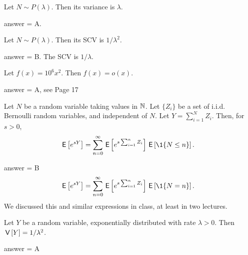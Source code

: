 \begin{exercise}[201902]
Let $N\sim P(\lambda)$. Then its variance is  $\lambda$. 

\begin{solution}
answer = A. %
\end{solution}
\end{exercise}

\begin{exercise}[201902]
Let $N\sim P(\lambda)$. Then its SCV is  $1/\lambda^2$. 
\begin{solution}
answer = B. The SCV is $1/\lambda$. %
\end{solution}
\end{exercise}

\begin{exercise}[201902]
Let $f(x) =  10^6 x^2$. Then $f(x) = o(x)$. 
\begin{solution}
answer = A, see Page 17
\end{solution}
\end{exercise}

\begin{exercise}[201902]
  Let $N$ be a random variable taking values in $\mathbb{N}$. Let $\{Z_i\}$ be a set of i.i.d. Bernoulli random variables, and independent of $N$. Let $Y=\sum_{i=1}^N Z_i$. 
  Then, for $s>0$, 
  \begin{equation*}
    \E{e^{sY}} = \sum_{n=0}^\infty \E{e^{s\sum_{i=1}^n Z_i} }\E{\1{N\leq n}}.
  \end{equation*}
\begin{solution} 
answer = B
  \begin{equation*}
    \E{e^{sY}} = \sum_{n=0}^\infty \E{e^{s\sum_{i=1}^n Z_i} }\E{\1{N= n}}.
  \end{equation*}
  We discussed this and similar expressions in class, at least in two lectures.  
\end{solution}
\end{exercise}

\begin{exercise}[201902]
Let $Y$ be a random variable,  exponentially distributed with rate $\lambda>0$. Then $\,\mathsf{V}\left[Y\right] = 1/\lambda^2$. 
\begin{solution}
answer = A %
\end{solution}
\end{exercise}

